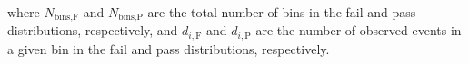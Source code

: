 where $N_{\text{bins,F}}$ and $N_{\text{bins,P}}$ are the total number of bins in the fail and pass distributions, respectively, and $d_{i,\text{F}}$ and $d_{i,\text{P}}$ are the number of observed events in a given bin in the fail and pass distributions, respectively.


